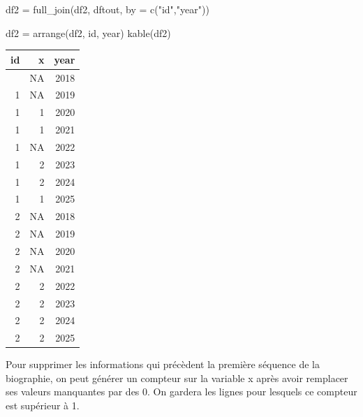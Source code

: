 \documentclass[
  12pt,
  letterpaper,
  DIV=11,
  numbers=noendperiod,
  onepage,
  openany]{scrreprt}
\newenvironment{Shaded}{\begin{snugshade}}{\end{snugshade}}
\newcommand{\AttributeTok}[1]{\textcolor[rgb]{0.80,0.80,0.80}{#1}}
\newcommand{\DecValTok}[1]{\textcolor[rgb]{0.86,0.86,0.80}{#1}}
\newcommand{\FunctionTok}[1]{\textcolor[rgb]{0.94,0.94,0.56}{#1}}
\newcommand{\NormalTok}[1]{\textcolor[rgb]{0.80,0.80,0.80}{#1}}
\newcommand{\OtherTok}[1]{\textcolor[rgb]{0.94,0.94,0.56}{#1}}
\newcommand{\SpecialCharTok}[1]{\textcolor[rgb]{0.86,0.64,0.64}{#1}}
\newcommand{\StringTok}[1]{\textcolor[rgb]{0.80,0.58,0.58}{#1}}
\begin{document}
\begin{Shaded}
\begin{Highlighting}[]
\NormalTok{df2 }\OtherTok{=} \FunctionTok{full\_join}\NormalTok{(df2, dftout, }\AttributeTok{by =} \FunctionTok{c}\NormalTok{(}\StringTok{"id"}\NormalTok{,}\StringTok{"year"}\NormalTok{))}

\NormalTok{df2 }\OtherTok{=} \FunctionTok{arrange}\NormalTok{(df2, id, year)}
\FunctionTok{kable}\NormalTok{(df2)    }
\end{Highlighting}
\end{Shaded}

\begin{longtable}[]{@{}rrr@{}}
\toprule\noalign{}
id & x & year \\
\midrule\noalign{}
\endhead
\bottomrule\noalign{}
\endlastfoot
1 & NA & 2018 \\
1 & NA & 2019 \\
1 & 1 & 2020 \\
1 & 1 & 2021 \\
1 & NA & 2022 \\
1 & 2 & 2023 \\
1 & 2 & 2024 \\
1 & 1 & 2025 \\
2 & NA & 2018 \\
2 & NA & 2019 \\
2 & NA & 2020 \\
2 & NA & 2021 \\
2 & 2 & 2022 \\
2 & 2 & 2023 \\
2 & 2 & 2024 \\
2 & 2 & 2025 \\
\end{longtable}

Pour supprimer les informations qui précèdent la première séquence de la
biographie, on peut générer un compteur sur la variable x après avoir
remplacer ses valeurs manquantes par des 0. On gardera les lignes pour
lesquels ce compteur est supérieur à 1.

\begin{Shaded}
\end{Shaded}
\end{document}
